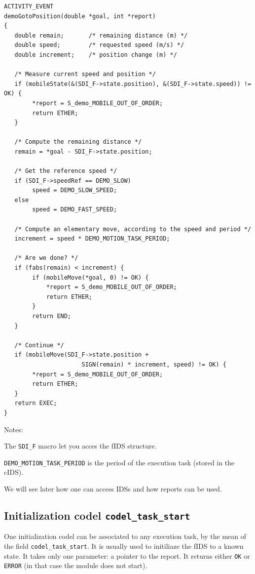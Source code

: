 \begin{center}\begin{cartouche}\small\begin{verbatim}
ACTIVITY_EVENT
demoGotoPosition(double *goal, int *report)
{
   double remain;       /* remaining distance (m) */
   double speed;        /* requested speed (m/s) */
   double increment;    /* position change (m) */

   /* Measure current speed and position */
   if (mobileState(&(SDI_F->state.position), &(SDI_F->state.speed)) != OK) {
        *report = S_demo_MOBILE_OUT_OF_ORDER;
        return ETHER;
   }

   /* Compute the remaining distance */
   remain = *goal - SDI_F->state.position;

   /* Get the reference speed */
   if (SDI_F->speedRef == DEMO_SLOW) 
        speed = DEMO_SLOW_SPEED;
   else
        speed = DEMO_FAST_SPEED;

   /* Compute an elementary move, according to the speed and period */
   increment = speed * DEMO_MOTION_TASK_PERIOD;

   /* Are we done? */
   if (fabs(remain) < increment) {
        if (mobileMove(*goal, 0) != OK) {
            *report = S_demo_MOBILE_OUT_OF_ORDER;
            return ETHER;
        }
        return END;
   }

   /* Continue */
   if (mobileMove(SDI_F->state.position +
                      SIGN(remain) * increment, speed) != OK) {
        *report = S_demo_MOBILE_OUT_OF_ORDER;
        return ETHER;
   }
   return EXEC;
}
\end{verbatim}\end{cartouche}\end{center}

Notes:

The {\tt SDI\_F} macro let you acces the fIDS structure.

{\tt DEMO\_MOTION\_TASK\_PERIOD} is the period of the execution task
(stored in the cIDS).

We will see later how one can access IDSs and how reports can be used.


\subsection{Initialization codel {\tt codel\_task\_start}}

One initialization codel can be associated to any  execution task, by the
mean of the field {\tt  codel\_task\_start}. It is  usually used to initiliaze
the fIDS to a known state. It takes only one  parameter: a pointer to the
report.   It returns either {\tt  OK}  or {\tt ERROR}  (in  that case the
module does not start).

